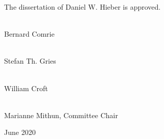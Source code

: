 \setlength{\parindent}{0em}
\def\signaturepadding{2.5em}
\thispagestyle{empty}

\begin{center}
  The dissertation of Daniel W. Hieber is approved.
\end{center}
\vspace{\signaturepadding}

\hrulefill\\
Bernard Comrie
\vspace{\signaturepadding}

\hrulefill\\
Stefan Th. Gries
\vspace{\signaturepadding}

\hrulefill\\
William Croft
\vspace{\signaturepadding}

\hrulefill\\
Marianne Mithun, Committee Chair
\vspace{\signaturepadding}

\begin{center}
  June 2020
\end{center}

\setlength{\parindent}{\defaultindent}
\restoregeometry
